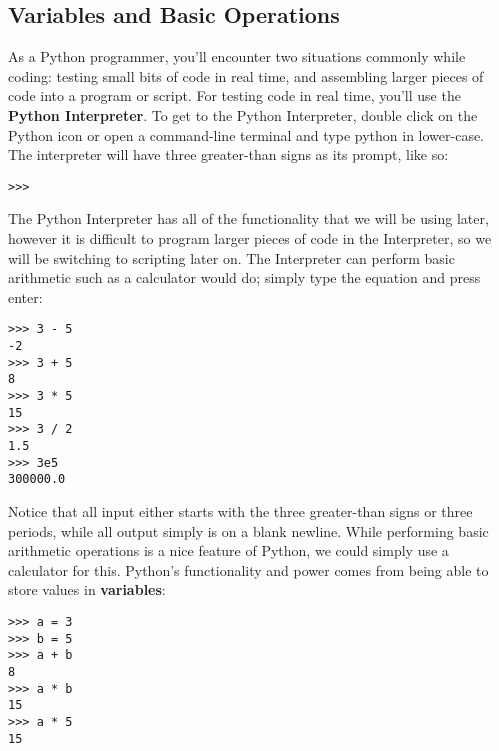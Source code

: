 \documentclass[a4paper,11pt]{article}
\begin{document}
\pagebreak
\subsection{Variables and Basic Operations}
As a Python programmer, you'll encounter two situations commonly while coding: testing small bits of code in real time,
and assembling larger pieces of code into a program or script.  For testing code in real time, you'll use the \textbf{Python
Interpreter}.  To get to the Python Interpreter, double click on the Python icon or open a command-line terminal and
type python in lower-case.  The interpreter will have three greater-than signs as its prompt, like so:

\vspace{3mm}
\begin{lstlisting}
>>>
\end{lstlisting}
\vspace{3mm}

The Python Interpreter has all of the functionality that we will be using later, however it is difficult to program
larger pieces of code in the Interpreter, so we will be switching to scripting later on.  The Interpreter can
perform basic arithmetic such as a calculator would do; simply type the equation and press enter:

\vspace{3mm}
\begin{lstlisting}
>>> 3 - 5
-2
>>> 3 + 5
8
>>> 3 * 5
15
>>> 3 / 2
1.5
>>> 3e5
300000.0
\end{lstlisting}
\vspace{3mm}

Notice that all input either starts with the three greater-than signs or three periods, while all output simply is on a
blank newline.  While performing basic arithmetic operations is a nice feature of Python, we could simply use a
calculator for this.  Python's functionality and power comes from being able to store values in \textbf{variables}:

\vspace{3mm}
\begin{lstlisting}
>>> a = 3
>>> b = 5
>>> a + b
8
>>> a * b
15
>>> a * 5
15
\end{lstlisting}
\vspace{3mm}
\end{document}
